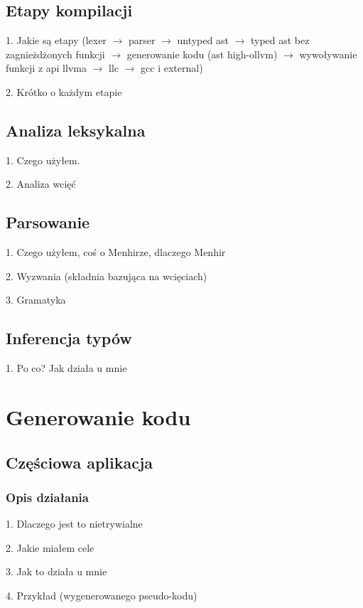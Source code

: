 \documentclass[declaration,shortabstract]{iithesis}
\begin{document}
\section{Etapy kompilacji}

1. Jakie są etapy (lexer $\rightarrow$ parser $\rightarrow$ untyped ast $\rightarrow$ 
typed ast bez zagnieżdżonych funkcji $\rightarrow$ generowanie kodu (ast high-ollvm)
$\rightarrow$ wywoływanie funkcji z api llvma $\rightarrow$ llc $\rightarrow$ gcc i external) 

2. Krótko o każdym etapie

\section{Analiza leksykalna}

1. Czego użyłem. 

2. Analiza wcięć 

\section{Parsowanie}

1. Czego użyłem, coś o Menhirze, dlaczego Menhir 

2. Wyzwania (składnia bazująca na wcięciach)

3. Gramatyka

\section{Inferencja typów}

1. Po co? Jak działa u mnie

\chapter{Generowanie kodu}
\section{Częściowa aplikacja}

\subsection{Opis działania}

1. Dlaczego jest to nietrywialne

2. Jakie miałem cele 

3. Jak to działa u mnie 

4. Przykład (wygenerowanego pseudo-kodu)
\end{document}
